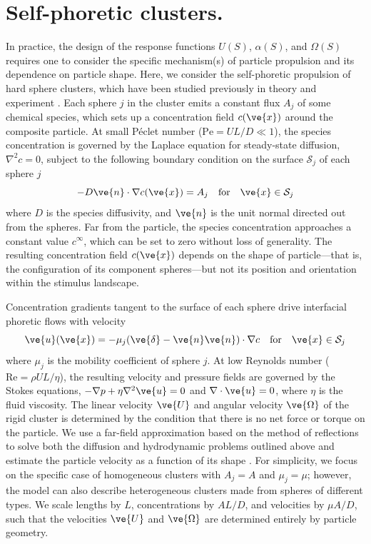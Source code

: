 \section{Self-phoretic clusters.}  
In practice, the design of the response functions $U(S)$, $\alpha(S)$, and $\Omega(S)$ requires one to consider the specific mechanism(s) of particle propulsion and its dependence on particle shape. Here, we consider the self-phoretic propulsion of hard sphere clusters, which have been studied previously in theory \cite{soto2014self, varma2018clustering} and experiment \cite{niu2018dynamics, schmidt2019light}. Each sphere $j$ in the cluster emits a constant flux $A_j$ of some chemical species, which sets up a concentration field $c(\ve{x})$ around the composite particle. At small P\'eclet number ($\text{Pe}=UL/D\ll1$), the species concentration is governed by the Laplace equation for steady-state diffusion, $\nabla^2c=0$, subject to the following boundary condition on the surface $\mathcal{S}_j$ of each sphere $j$
\begin{equation}
   -D\ve{n} \cdot \nabla c(\ve{x}) = A_j \quad \text{for} \quad \ve{x}\in \mathcal{S}_j
\end{equation}
where $D$ is the species diffusivity, and $\ve{n}$ is the unit normal directed out from the spheres.  Far from the particle, the species concentration approaches a constant value $c^{\infty}$, which can be set to zero without loss of generality. The resulting concentration field $c(\ve{x})$ depends on the shape of particle---that is, the configuration of its component spheres---but not its position and orientation within the stimulus landscape.

Concentration gradients tangent to the surface of each sphere drive interfacial phoretic flows with velocity 
\begin{equation}
    \ve{u}(\ve{x})=-\mu_j (\ve{\delta}-\ve{n}\ve{n}) \cdot \nabla c\quad \text{for} \quad \ve{x}\in \mathcal{S}_j
\end{equation}
where  $\mu_j$ is the mobility coefficient of sphere $j$.  At low Reynolds number ($\text{Re}=\rho UL/\eta$), the resulting velocity and pressure fields are governed by the Stokes equations, $-\nabla p + \eta \nabla^2 \ve{u}=0$ and $\nabla \cdot \ve{u}=0$, where $\eta$ is the fluid viscosity.  The linear velocity $\ve{U}$ and angular velocity $\ve{\Omega}$ of the rigid cluster is determined by the condition that there is no net force or torque on the particle.  We use a far-field approximation based on the method of reflections \cite{varma2018clustering} to solve both the diffusion and hydrodynamic problems outlined above and estimate the particle velocity as a function of its shape \cite{Supp}. For simplicity, we focus on the specific case of homogeneous clusters with $A_j=A$ and $\mu_j=\mu$; however, the model can also describe heterogeneous clusters made from spheres of different types.  We scale lengths by $L$, concentrations by $A L/D$, and velocities by $\mu A/D$, such that the velocities $\ve{U}$ and $\ve{\Omega}$ are determined entirely by particle geometry.   

